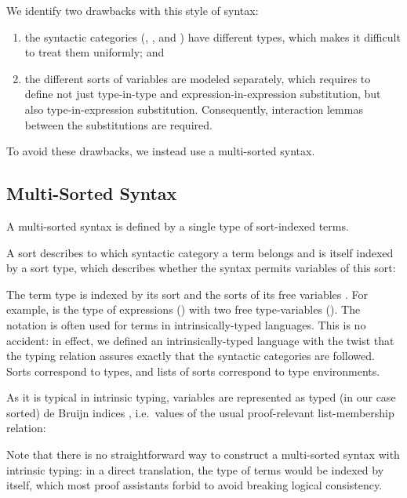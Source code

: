 \documentclass[a4paper, UKenglish, cleveref, autoref, thm-restate]{lipics-v2021}
\newenvironment{LibCode*}{%
  \begin{tcolorbox}[%
    colframe=white,%
    boxrule=0.0pt,%
    top=2.5pt,%
    left=2.5pt,%
    bottom=2.5pt,%
    right=2.5pt,%
    before skip=5pt,%
    after skip=5pt,%
    boxsep=0pt%
  ]
}{%
  \end{tcolorbox}%
}
\newcommand*\LibCode[1]{\begin{LibCode*}{#1}\end{LibCode*}}
\newcommand*\AppCode[1]{{#1}}
\newcommand*\ACode[1]{\AgdaFontStyle{\textcolor{mygray}{#1}}}
\newcommand*\ACon[1]{\AgdaInductiveConstructor{#1}}
\begin{document}
  We identify two drawbacks with this style of syntax:
  \begin{enumerate}
  \item
    the syntactic categories (\ACode{\ACon{Kind}},
    \ACode{\ACon{Type}}, and \ACode{\ACon{Expr}})
    have different types, which makes it difficult to treat them uniformly; and
  \item the different sorts of variables are modeled separately, which requires to define not just
    type-in-type and expression-in-expression substitution, but also type-in-expression substitution.
    Consequently, interaction lemmas between the substitutions are required.
  \end{enumerate}
  To avoid these drawbacks, we instead use a multi-sorted syntax.

  \subsection{Multi-Sorted Syntax}
  \label{sec:syntax:multi}
  A multi-sorted syntax is defined by a single type of sort-indexed terms.

  A sort describes to which syntactic category a term belongs and is
  itself indexed by a sort type, which describes whether the syntax
  permits variables of this sort:
  \LibCode\KSortTy
  \AppCode\FSort
  
  The term type \ACode{S \ACon{⊢} s} is indexed by its sort
  \ACode{s} and the sorts of its free variables \ACode{S}.
  For example, \ACode{\ACon{[𝕥, 𝕥] ⊢ 𝕖}} is the type of expressions
  (\ACode{\ACon{𝕖}}) with two free type-variables (\ACode{\ACon{𝕥}}).
  \AppCode\FSyntax
  The notation \ACode{\ACon{\_⊢\_}} is often used for terms in
  intrinsically-typed languages. This is no accident: in effect, we
  defined an intrinsically-typed language with the twist that the
  typing relation assures exactly that the syntactic categories are followed.
  Sorts \ACode{s} correspond to types, and lists of sorts \ACode{S}
  correspond to type environments.

  As it is typical in intrinsic typing, variables are represented as
  typed (in our case sorted) de Bruijn indices \ACode{S \ACon{∋} s}, i.e.\
  values of the usual proof-relevant list-membership relation:
  \LibCode\KVariables

  Note that there is no straightforward way to construct a
  multi-sorted syntax with intrinsic typing: in a direct translation,
  the type of terms \ACode{\ACon{\_⊢\_}} would be indexed by itself, which
  most proof assistants forbid to avoid breaking logical consistency.
\end{document}
